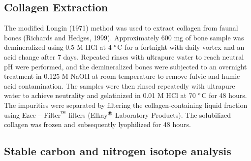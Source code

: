 \documentclass[5p]{elsarticle} %
\begin{document}
\hypertarget{collagen-extraction}{%
\subsection{Collagen Extraction}\label{collagen-extraction}}

The modified Longin (1971) method was used to extract collagen from faunal bones (Richards and Hedges, 1999). Approximately 600 mg of bone sample was demineralized using 0.5 M HCl at 4 \(\text{\textdegree}\)C for a fortnight with daily vortex and an acid change after 7 days. Repeated rinses with ultrapure water to reach neutral pH were performed, and the demineralized bones were subjected to an overnight treatment in 0.125 M NaOH at room temperature to remove fulvic and humic acid contamination. The samples were then rinsed repeatedly with ultrapure water to achieve neutrality and gelatinized in 0.01 M HCl at 70 \(\text{\textdegree}\)C for 48 hours. The impurities were separated by filtering the collagen-containing liquid fraction using Ezee -- Filter\(^\text{\texttrademark}\) filters (Elkay\(^\text{\textregistered}\) Laboratory Products). The solubilized collagen was frozen and subsequently lyophilized for 48 hours.

\hypertarget{stable-carbon-and-nitrogen-isotope-analysis}{%
\subsection{Stable carbon and nitrogen isotope analysis}\label{stable-carbon-and-nitrogen-isotope-analysis}}
\end{document}
